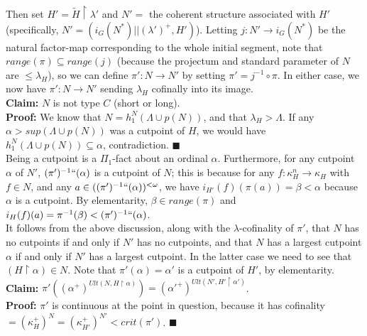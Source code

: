 \documentclass[12pt]{article}
\begin{document}
Then set $H' = \tilde{H} \restriction \lambda'$ and $N' =$ the coherent structure associated with $H'$ (specifically, $N' = ( i_{G} (N^* ) || (\lambda')^+ , H' )$).  Letting $j : N' \longrightarrow i_{G} (N^* )$ be the natural factor-map corresponding to the whole initial segment, note that $range(\pi ) \subseteq range (j)$ (because the projectum and standard parameter of $N$ are $\leq \lambda_H$), so we can define $\pi' : N \longrightarrow N'$ by setting $\pi' = j^{-1} \circ \pi$.  In either case, we now have $\pi' : N \longrightarrow N'$ sending $\lambda_H$ cofinally into its image.\\

\textbf{Claim:} $N$ is not type $C$ (short or long).\\

\textbf{Proof:}  We know that $N = h_1^N (\Lambda \cup p (N))$, and that $\lambda_H > \Lambda$.  If any $\alpha > sup (\Lambda \cup p (N))$ was a cutpoint of $H$, we would have $h_1^N (\Lambda \cup p (N)) \subseteq \alpha$, contradiction. $\blacksquare$\\

Being a cutpoint is a $\Pi_1$-fact about an ordinal $\alpha$.  Furthermore, for any cutpoint $\alpha$ of $N'$, $(\pi' )^{-1} `` (\alpha )$ is a cutpoint of $N$; this is because for any $f: \kappa_H^{n} \longrightarrow \kappa_H$ with $f \in N$, and any $a \in ((\pi' )^{-1} `` (\alpha ))^{< \omega }$, we have $i_{H'} (f)(\pi(a)) = \beta < \alpha$ because $\alpha$ is a cutpoint.  By elementarity, $\beta \in range(\pi )$ and $i_H (f)(a) = \pi^{-1} (\beta ) < (\pi' )^{-1} `` (\alpha )$.\\

It follows from the above discussion, along with the $\lambda$-cofinality of $\pi'$, that $N$ has no cutpoints if and only if $N'$ has no cutpoints, and that $N$ has a largest cutpoint $\alpha$ if and only if $N'$ has a largest cutpoint.  In the latter case we need to see that $(H \restriction \alpha ) \in N$.  Note that $\pi' (\alpha ) = \alpha'$ is a cutpoint of $H'$, by elementarity.\\

\textbf{Claim:} $\pi' ((\alpha^+)^{Ult ( N , H \restriction \alpha )}) = (\alpha'^+ )^{Ult (N' , H' \restriction \alpha' )}$.\\

\textbf{Proof:} $\pi'$ is continuous at the point in question, because it has cofinality $= (\kappa_H^+ )^N = ( \kappa_{H'}^+ )^{N'} < crit (\pi' )$. $\blacksquare$\\
\end{document}

